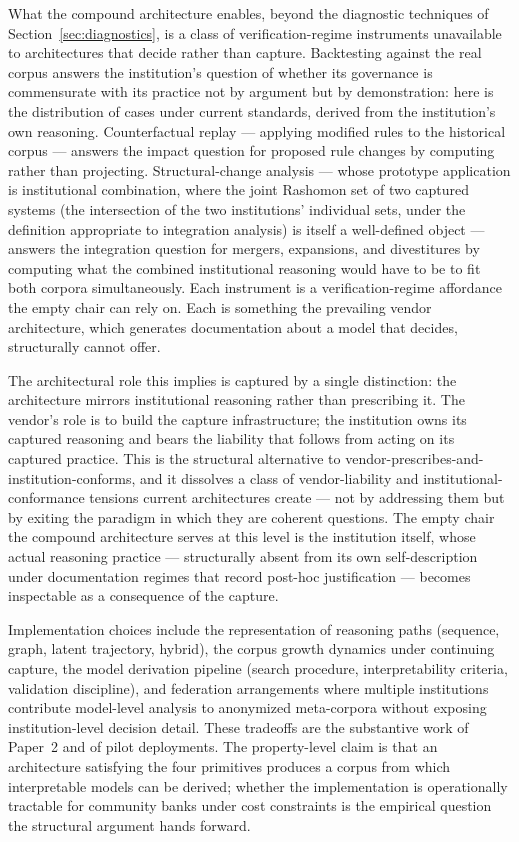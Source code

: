 What the compound architecture enables, beyond the diagnostic techniques of Section~\ref{sec:diagnostics}, is a class of verification-regime instruments unavailable to architectures that decide rather than capture. Backtesting against the real corpus answers the institution's question of whether its governance is commensurate with its practice not by argument but by demonstration: here is the distribution of cases under current standards, derived from the institution's own reasoning. Counterfactual replay --- applying modified rules to the historical corpus --- answers the impact question for proposed rule changes by computing rather than projecting. Structural-change analysis --- whose prototype application is institutional combination, where the joint Rashomon set of two captured systems (the intersection of the two institutions' individual sets, under the definition appropriate to integration analysis) is itself a well-defined object --- answers the integration question for mergers, expansions, and divestitures by computing what the combined institutional reasoning would have to be to fit both corpora simultaneously. Each instrument is a verification-regime affordance the empty chair can rely on. Each is something the prevailing vendor architecture, which generates documentation about a model that decides, structurally cannot offer.

The architectural role this implies is captured by a single distinction: the architecture mirrors institutional reasoning rather than prescribing it. The vendor's role is to build the capture infrastructure; the institution owns its captured reasoning and bears the liability that follows from acting on its captured practice. This is the structural alternative to vendor-prescribes-and-institution-conforms, and it dissolves a class of vendor-liability and institutional-conformance tensions current architectures create --- not by addressing them but by exiting the paradigm in which they are coherent questions. The empty chair the compound architecture serves at this level is the institution itself, whose actual reasoning practice --- structurally absent from its own self-description under documentation regimes that record post-hoc justification --- becomes inspectable as a consequence of the capture.

\quarry{} Implementation choices include the representation of reasoning paths (sequence, graph, latent trajectory, hybrid), the corpus growth dynamics under continuing capture, the model derivation pipeline (search procedure, interpretability criteria, validation discipline), and federation arrangements where multiple institutions contribute model-level analysis to anonymized meta-corpora without exposing institution-level decision detail. These tradeoffs are the substantive work of Paper~2 and of pilot deployments. The property-level claim is that an architecture satisfying the four primitives produces a corpus from which interpretable models can be derived; whether the implementation is operationally tractable for community banks under cost constraints is the empirical question the structural argument hands forward.

